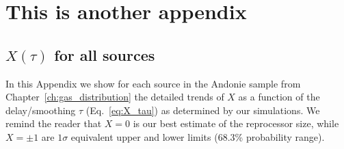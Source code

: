 
\chapter{This is another appendix}


\section{$X(\tau)$ for all sources} \label{appendix_lightcurves}
In this Appendix we show for each source in the Andonie sample from Chapter~\ref{ch:gas_distribution} the detailed trends of $X$ as a function of the delay/smoothing $\tau$ (Eq.~\ref{eq:X_tau}) as determined by our simulations. We remind the reader that $X=0$ is our best estimate of the reprocessor size, while $X=\pm 1$ are $1\sigma$ equivalent upper and lower limits (68.3\% probability range).

